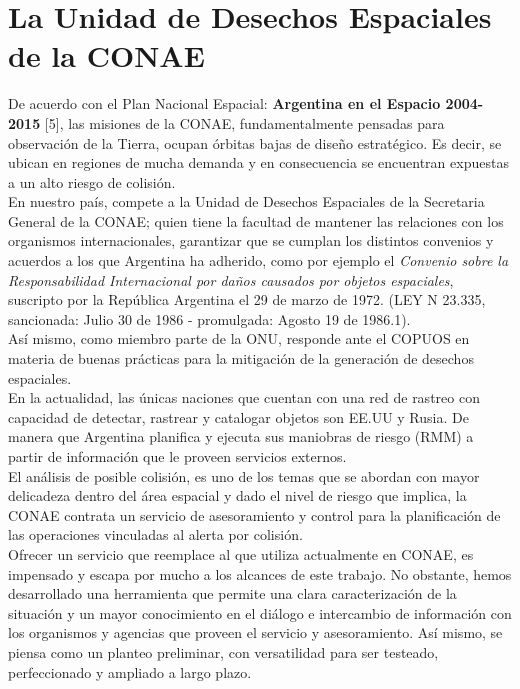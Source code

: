 \section{La Unidad de Desechos Espaciales de la CONAE}
De acuerdo con el Plan Nacional Espacial: {\bf{ Argentina en el Espacio 2004-2015}} [5], las misiones de la CONAE, fundamentalmente pensadas para observaci\'on de la Tierra, ocupan \'orbitas bajas de dise\~no estrat\'egico. Es decir, se ubican en regiones de mucha demanda y en consecuencia se encuentran expuestas a un alto riesgo de colisi\'on.\\
En nuestro pa\'is, compete a la Unidad de Desechos Espaciales de la Secretaria General de la CONAE; quien tiene la facultad de mantener las relaciones con los organismos internacionales, garantizar que se cumplan los distintos convenios y acuerdos a los que Argentina ha adherido, como por ejemplo el {\it{Convenio sobre la Responsabilidad Internacional por da\~nos causados por objetos espaciales}}, suscripto por la Rep\'ublica Argentina el 29 de marzo de 1972. (LEY N 23.335, sancionada: Julio 30 de 1986 - promulgada: Agosto 19 de 1986.1).\\
As\'i mismo, como miembro parte de la ONU, responde ante el COPUOS en materia de buenas pr\'acticas para la mitigaci\'on de la generaci\'on de desechos espaciales.\\

En la actualidad, las \'unicas naciones que cuentan con una red de rastreo con capacidad de detectar, rastrear y catalogar objetos son EE.UU y Rusia. De manera que Argentina planifica y ejecuta sus maniobras de riesgo (RMM) a partir de informaci\'on que le proveen servicios externos.\\

El an\'alisis de posible colisi\'on, es uno de los temas que se abordan con mayor delicadeza dentro del \'area espacial y dado el nivel de riesgo que implica, la CONAE contrata un servicio de asesoramiento y control para la planificaci\'on de las operaciones vinculadas al alerta por colisi\'on.\\
Ofrecer un servicio que reemplace al que utiliza actualmente en CONAE, es impensado y escapa por mucho a los alcances de este trabajo. No obstante, hemos desarrollado una herramienta que permite una clara caracterizaci\'on de la situaci\'on y un mayor conocimiento en el di\'alogo e intercambio de informaci\'on con los organismos y agencias que proveen el servicio y asesoramiento. As\'i mismo, se piensa como un planteo preliminar, con versatilidad para ser testeado, perfeccionado y ampliado a largo plazo.\\

